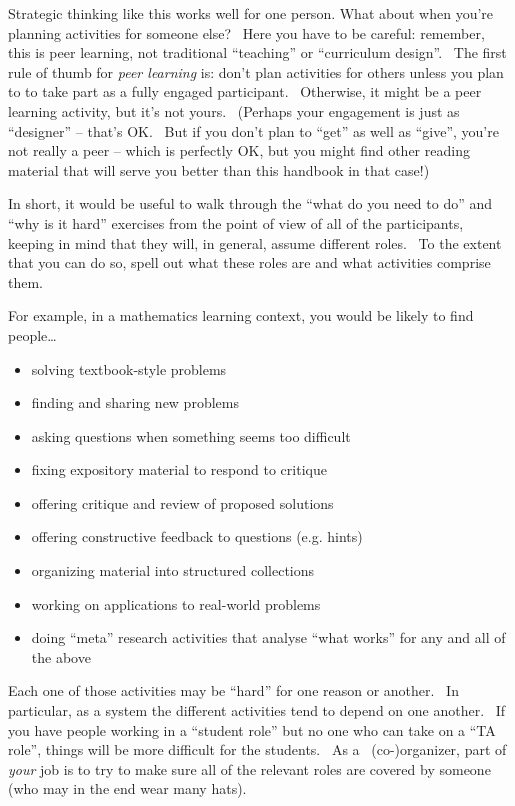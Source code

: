 Strategic thinking like this works well for one person. What about when
you're planning activities for someone else? ~Here you have to be
careful: remember, this is peer learning, not traditional ``teaching''
or ``curriculum design''. ~The first rule of thumb for \emph{peer
learning} is: don't plan activities for others unless you plan to to
take part as a fully engaged participant.~ Otherwise, it might be a peer
learning activity, but it's not yours.~ (Perhaps your engagement is just
as ``designer'' -- that's OK.~ But if you don't plan to ``get'' as well
as ``give'', you're not really a peer -- which is perfectly OK, but you
might find other reading material that will serve you better than this
handbook in that case!)

In short, it would be useful to walk through the ``what do you need to
do'' and ``why is it hard'' exercises from the point of view of all of
the participants, keeping in mind that they will, in general, assume
different roles. ~To the extent that you can do so, spell out what these
roles are and what activities comprise them.

For example, in a mathematics learning context, you would be likely to
find people\ldots{}

\begin{itemize}
\item
  solving textbook-style problems
\item
  finding and sharing new problems
\item
  asking questions when something seems too difficult
\item
  fixing expository material to respond to critique
\item
  offering critique and review of proposed solutions
\item
  offering constructive feedback to questions (e.g. hints)
\item
  organizing material into structured collections
\item
  working on applications to real-world problems
\item
  doing ``meta'' research activities that analyse ``what works'' for any
  and all of the above
\end{itemize}

Each one of those activities may be ``hard'' for one reason or another.
~In particular, as a system the different activities tend to depend on
one another. ~If you have people working in a ``student role'' but no
one who can take on a ``TA role'', things will be more difficult for the
students. ~As a~ (co-)organizer, part of \emph{your} job is to try to
make sure all of the relevant roles are covered by someone (who may in
the end wear many hats).

